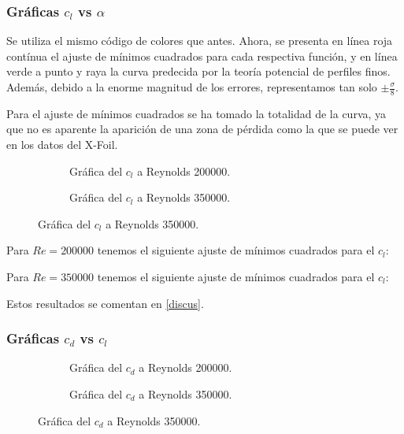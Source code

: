 \documentclass{article}
\begin{document}
\subsubsection{Gráficas \texorpdfstring{$c_l$}{lift} vs \texorpdfstring{$\alpha$}{alpha}}

Se utiliza el mismo código de colores que antes. Ahora, se presenta en línea roja contínua el ajuste de 
mínimos cuadrados para cada respectiva función, y en línea verde a punto y raya la curva predecida por la 
teoría potencial de perfiles finos. Además, debido a la enorme magnitud de los errores, representamos
tan solo $\pm \frac{\sigma}{8}$.

Para el ajuste de mínimos cuadrados se ha tomado la totalidad de la curva, ya que no es aparente la 
aparición de una zona de pérdida como la que se puede ver en los datos del X-Foil. 

\begin{figure}[H]
    \centering
    \begin{subfigure}{.48\textwidth}
        \resizebox{\linewidth}{!}{}
        \caption{Gráfica del $c_l$ a Reynolds 200000. }
        \label{fig:res9}    
    \end{subfigure}
    \hspace{0cm}
    \begin{subfigure}{.48\textwidth}
        \resizebox{\linewidth}{!}{}
        \caption{Gráfica del $c_l$ a Reynolds 350000. }
        \label{fig:res10}     
    \end{subfigure}
\end{figure}

Para $Re = 200000$ tenemos el siguiente ajuste de mínimos cuadrados para el $c_l$:




Para $Re = 350000$ tenemos el siguiente ajuste de mínimos cuadrados para el $c_l$:



Estos resultados se comentan en \ref{discus}.

\subsubsection{Gráficas \texorpdfstring{$c_d$}{drag} vs \texorpdfstring{$c_l$}{lift}}

\begin{figure}[H]
    \centering
    \begin{subfigure}{.48\textwidth}
        \resizebox{\linewidth}{!}{}
        \caption{Gráfica del $c_d$ a Reynolds 200000. }
        \label{fig:res11}    
    \end{subfigure}
    \hspace{0cm}
    \begin{subfigure}{.48\textwidth}
        \resizebox{\linewidth}{!}{}
        \caption{Gráfica del $c_d$ a Reynolds 350000. }
        \label{fig:res12}     
    \end{subfigure}
\end{figure}
\end{document}
